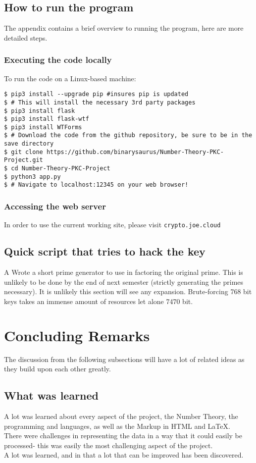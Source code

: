 \documentclass[a4paper]{article}
\begin{document}
\subsection{How to run the program}
The appendix contains a brief overview to running the program, here are more detailed steps.
\subsubsection{Executing the code locally}
To run the code on a Linux-based machine:
\begin{verbatim}
$ pip3 install --upgrade pip #insures pip is updated
$ # This will install the necessary 3rd party packages
$ pip3 install flask
$ pip3 install flask-wtf
$ pip3 install WTForms
$ # Download the code from the github repository, be sure to be in the save directory
$ git clone https://github.com/binarysaurus/Number-Theory-PKC-Project.git
$ cd Number-Theory-PKC-Project
$ python3 app.py
$ # Navigate to localhost:12345 on your web browser! 
\end{verbatim}
\subsubsection{Accessing the web server}
In order to use the current working site, please visit \texttt{crypto.joe.cloud}

\subsection{Quick script that tries to hack the key}
A Wrote a short prime generator to use in factoring the original prime. This is unlikely to be done by the end of next semester (strictly generating the primes necessary). 
It is unlikely this section will see any expansion. Brute-forcing 768 bit keys takes an immense amount of resources let alone 7470 bit.

\section{Concluding Remarks}
The discussion from the following subsections will have a lot of related ideas as they build upon each other greatly. 
\subsection{What was learned}
A lot was learned about every aspect of the project, the Number Theory, the programming and languages, as well as the Markup in HTML and \LaTeX{}. \\
There were challenges in representing the data in a way that it could easily be processed- this was easily the most challenging aspect of the project. \\ 
A lot was learned, and in that a lot that can be improved has been discovered. 
\end{document}
